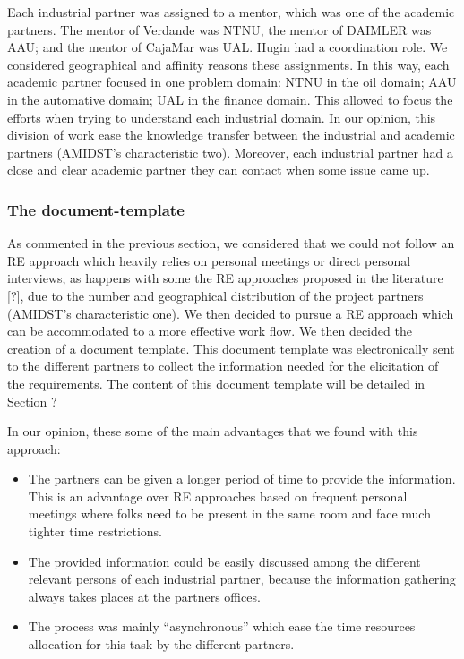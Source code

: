 \documentclass[11pt, oneside]{article}   	%
\begin{document}
Each industrial partner was assigned to a mentor, which was one of the academic partners. The mentor of Verdande was NTNU, the mentor of DAIMLER was AAU; and the mentor of CajaMar was UAL. Hugin had a coordination role. We considered geographical and affinity reasons these assignments. In this way, each academic partner focused in one problem domain: NTNU in the oil domain; AAU in the automative domain; UAL in the finance domain. This allowed to focus the efforts when trying to understand each industrial domain. In our opinion, this division of work ease the knowledge transfer between the industrial and academic partners (AMIDST's characteristic two). Moreover, each industrial partner had a close and clear academic partner they can contact when some issue came up. 




\subsubsection*{The document-template}

As commented in the previous section, we considered that we could not follow an RE approach which heavily relies on personal meetings or direct personal interviews, as happens with some the RE approaches proposed in the literature [?], due to the number and geographical distribution of the project partners (AMIDST's characteristic one). We then decided to pursue a RE approach which can be accommodated to a more effective work flow. We then decided the creation of a document template. This document template was electronically  sent to the different partners to collect the information needed for the elicitation of the requirements. The content of this document template will be detailed in Section ?

In our opinion, these some of the main advantages that we found with this approach:

\begin{itemize}
\item  The partners can be given a longer period of time to provide the information. This is an advantage over RE approaches based on frequent personal meetings where folks need to be present in the same room and face much tighter time restrictions. 

\item The provided information could be easily discussed among the different relevant persons of each industrial partner, because the information gathering always takes places at the partners offices.

\item The process was mainly ``asynchronous'' which ease the time resources allocation for this task by the different partners.
\end{itemize}
\end{document}
